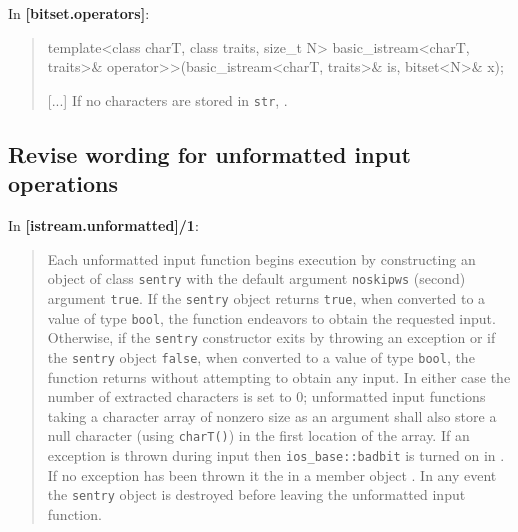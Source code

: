 \documentclass{wg21}
\begin{document}
In \textbf{[bitset.operators]}:
\begin{quote}
\begin{codeblock}
template<class charT, class traits, size_t N>
  basic_istream<charT, traits>&
    operator>>(basic_istream<charT, traits>& is, bitset<N>& x);
\end{codeblock}
[...]
If no characters are stored in \texttt{str}, .
\end{quote}


\subsection{Revise wording for unformatted input operations}
In \textbf{[istream.unformatted]/1}:
\begin{quote}
Each unformatted input function begins execution by constructing  an object
of class \texttt{sentry} with the default argument \texttt{noskipws} (second)
argument \texttt{true}. If the \texttt{sentry} object returns \texttt{true},
when converted to a value of type \texttt{bool}, the function endeavors to
obtain the requested input. Otherwise, if the \texttt{sentry} constructor
exits by throwing an exception or if the \texttt{sentry} object 
\texttt{false}, when converted to a value of type \texttt{bool}, the
function returns without attempting to obtain any input. In either case
the number of extracted characters is set to 0; unformatted input functions
taking a character array of nonzero size as an argument shall also store
a null character (using \texttt{charT()}) in the first location of the
array.  If an exception is thrown during input then \texttt{ios_base::badbit}
is turned on in .
If no exception has been thrown it  the
 in a member object
.  In any event the \texttt{sentry} object is destroyed
before leaving the unformatted input function.
\end{quote}
\end{document}
